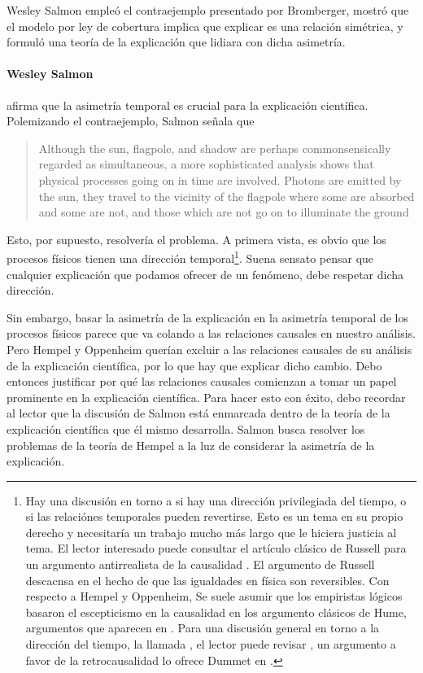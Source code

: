 Wesley Salmon empleó el contraejemplo presentado por Bromberger,
mostró que el modelo por ley de cobertura implica que explicar es una
relación simétrica, y formuló una teoría de la explicación que
lidiara con dicha asimetría.

\paragraph{Wesley Salmon \parencite{Salmon1970}} afirma que la asimetría
temporal es crucial para la explicación científica. Polemizando el
contraejemplo, Salmon señala que

\begin{quote}
 Although the sun, flagpole, and shadow are perhaps commonsensically
 regarded as simultaneous, a more sophisticated analysis shows that
 physical processes going on in time are involved.
 Photons are emitted
 by the sun, they travel to the	vicinity of the flagpole where some
 are absorbed and some are	not, and those which are not go on to
 illuminate the ground \parencite[p.~72]{Salmon1970}
\end{quote}

Esto, por supuesto, resolvería el problema. A primera vista, es obvio
que los procesos físicos tienen una dirección temporal\footnote{ Hay
 una discusión en torno a si hay una dirección privilegiada del
 tiempo, o si las relaciónes temporales pueden revertirse. Esto es un
 tema en su propio derecho y necesitaría un trabajo mucho más largo
 que le hiciera justicia al tema. El lector interesado puede consultar
 el artículo clásico de Russell para un argumento antirrealista de la
 causalidad \parencite{onthecauserussell}. El argumento de Russell
 descacnsa en el hecho de que las igualdades en física son
 reversibles. Con respecto a Hempel y Oppenheim, Se suele asumir que
 los empiristas lógicos basaron el escepticismo en la causalidad en
 los argumento clásicos de Hume, argumentos que aparecen en
 \parencite{hume1784}. Para una discusión general en torno a la
 dirección del tiempo, la llamada , el lector
 puede revisar \parencite{utmArrowTime}, un argumento a favor de la
 retrocausalidad lo ofrece Dummet en \parencite{dummetcause}. }. Suena
sensato pensar que cualquier explicación que podamos ofrecer de un
fenómeno, debe respetar dicha dirección.

Sin embargo, basar la asimetría de la explicación en la asimetría
temporal de los procesos físicos parece que va colando a las
relaciones causales en nuestro análisis. Pero Hempel y Oppenheim
querían excluir a las relaciones causales de su análisis de la
explicación científica, por lo que hay que explicar dicho cambio.
Debo entonces justificar por qué las relaciones causales comienzan a
tomar un papel prominente en la explicación científica. Para hacer
esto con éxito, debo recordar al lector que la discusión de Salmon
está enmarcada dentro de la teoría de la explicación científica que
él mismo desarrolla. Salmon busca resolver los problemas de la teoría
de Hempel a la luz de considerar la asimetría de la explicación.

